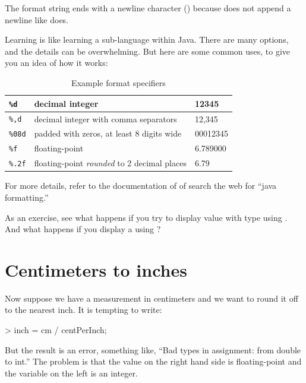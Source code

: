The format string ends with a newline character (\java{\\n}) because  does not append a newline like  does.

Learning  is like learning a sub-language within Java.
There are many options, and the details can be overwhelming.
But here are some common uses, to give you an idea of how it works:

\begin{table}[!h]
\begin{tabular}{|l|l|l|}
\hline
{\tt \%d} & decimal integer & 12345 \\
\hline
{\tt \%,d} & decimal integer with comma separators & 12,345 \\
\hline
{\tt \%08d} & padded with zeros, at least 8 digits wide & 00012345 \\
\hline
{\tt \%f} & floating-point & 6.789000 \\
\hline
{\tt \%.2f} & floating-point {\em rounded} to 2 decimal places & 6.79 \\
\hline
\end{tabular}
\caption{Example format specifiers}
\end{table}

For more details, refer to the documentation of 
of search the web for ``java formatting.''

As an exercise, see what happens if you try to display value with
type  using .  And what happens if you display
a  using ?


\section{Centimeters to inches}
\label{sec:rounding}

Now suppose we have a measurement in centimeters and we want to
round it off to the nearest inch.  It is tempting to write:

\begin{code}
> inch = cm / centPerInch;
\end{code}

But the result is an error, something like, ``Bad types in
assignment: from double to int.''  The problem is that the value
on the right hand side is floating-point and the variable on the
left is an integer.




